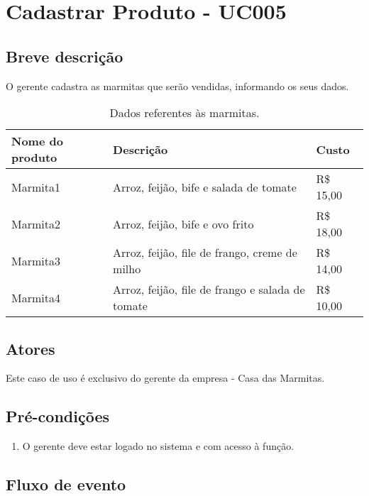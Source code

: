 \chapter{Cadastrar Produto - UC005} \label{uc005}

\section{Breve descrição}

O gerente cadastra as marmitas que serão vendidas, informando os seus dados.

\begin{table}[htb]
	\ABNTEXfontereduzida
	\caption[Dados referentes às marmitas]{Dados referentes às marmitas.}
	\centering
	\label{tab-marmitas}
	\begin{tabular}{|p{4cm}|p{8cm}|p{2cm}|}
		\textbf{Nome do produto} & \textbf{Descrição}                               & \textbf{Custo} \\ \hline
		Marmita1                           & Arroz, feijão, bife e salada de tomate           & R\$ 15,00      \\ \hline
		Marmita2                           & Arroz, feijão, bife e ovo frito                  & R\$ 18,00      \\ \hline
		Marmita3                           & Arroz, feijão, file de frango, creme de milho    & R\$ 14,00      \\ \hline
		Marmita4                           & Arroz, feijão, file de frango e salada de tomate & R\$ 10,00
	\end{tabular}
\end{table}

\section{Atores}

Este caso de uso é exclusivo do gerente da empresa - Casa das Marmitas.

\section{Pré-condições}

\begin{enumerate}
	\item O gerente deve estar logado no sistema e com acesso à função.
\end{enumerate}

\section{Fluxo de evento}

